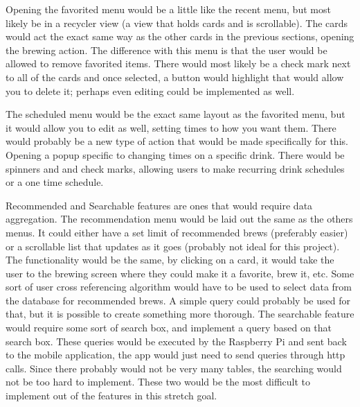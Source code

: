 \documentclass[conference]{IEEEtran}
\begin{document}
\par Opening the favorited menu would be a little like the recent menu, but most likely be in a recycler view (a view that holds cards and is scrollable). The cards would act the exact same way
as the other cards in the previous sections, opening the brewing action. The difference with this menu is that the user would be allowed to remove favorited items. There would most likely be
a check mark next to all of the cards and once selected, a button would highlight that would allow you to delete it; perhaps even editing could be implemented as well.

\par The scheduled menu would be the exact same layout as the favorited menu, but it would allow you to edit as well, setting times to how you want them. There would probably be
a new type of action that would be made specifically for this. Opening a popup specific to changing times on a specific drink. There would be spinners and and check marks, allowing
users to make recurring drink schedules or a one time schedule.

\par Recommended and Searchable features are ones that would require data aggregation. The recommendation menu would be laid out the same as the others menus. It could either 
have a set limit of recommended brews (preferably easier) or a scrollable list that updates as it goes (probably not ideal for this project). The functionality would be the same, by clicking on
a card, it would take the user to the brewing screen where they could make it a favorite, brew it, etc. Some sort of user cross referencing algorithm would have to be used to select data
from the database for recommended brews. A simple query could probably be used for that, but it is possible to create something more thorough. The searchable feature would require
some sort of search box, and implement a query based on that search box. These queries would be executed by the Raspberry Pi and sent back to the mobile application, the app would
just need to send queries through http calls.
Since there probably would not be very many tables, the searching would not be too hard to implement. These
two would be the most difficult to implement out of the features in this stretch goal.
\end{document}
